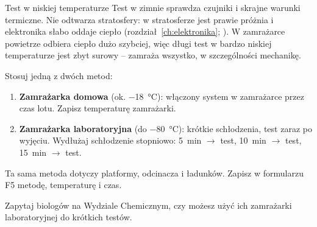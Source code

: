 \begin{podsekcja}{Test w niskiej temperaturze}\label{sec:test-zimno}
Test w zimnie sprawdza czujniki i skrajne warunki termiczne. Nie odtwarza stratosfery: w stratosferze jest prawie próżnia i elektronika słabo oddaje ciepło (rozdział~\ref{ch:elektronika}; \cite[rozdz.~12]{nasahb}). W zamrażarce powietrze odbiera ciepło dużo szybciej, więc długi test w bardzo niskiej temperaturze jest zbyt surowy -- zamraża wszystko, w szczególności mechanikę.

Stosuj jedną z dwóch metod:
\begin{enumerate}
  \item \textbf{Zamrażarka domowa} (ok. \SI{-18}{\degreeCelsius}): włączony system w zamrażarce przez czas lotu. Zapisz temperaturę zamrażarki.
  \item \textbf{Zamrażarka laboratoryjna} (do \SI{-80}{\degreeCelsius}): krótkie schłodzenia, test zaraz po wyjęciu. Wydłużaj schłodzenie stopniowo: 5~min $\to$ test, 10~min $\to$ test, 15~min $\to$ test.
\end{enumerate}
Ta sama metoda dotyczy platformy, odcinacza i ładunków. Zapisz w formularzu F5 metodę, temperaturę i czas.

\begin{wskazowka}Zapytaj biologów na Wydziale Chemicznym, czy możesz użyć ich zamrażarki laboratoryjnej do krótkich testów.\end{wskazowka}
\end{podsekcja}

